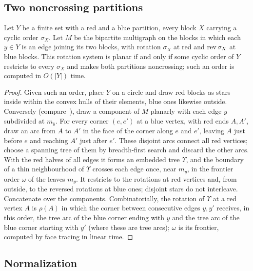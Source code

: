 \subsection{Two noncrossing partitions}\label{sec:v4-partitions}

\begin{lemma}\label{lem:v4-partitions}
Let $Y$ be a finite set with a red and a blue partition, every block $X$
carrying a cyclic order $\sigma_X$. Let $M$ be the bipartite multigraph on
the blocks in which each $y\in Y$ is an edge joining its two blocks, with
rotation $\sigma_X$ at red and $\operatorname{rev}\sigma_X$ at blue blocks. This rotation
system is planar if and only if some cyclic order of $Y$ restricts to every
$\sigma_X$ and makes both partitions noncrossing; such an order is computed
in $O(|Y|)$ time.
\end{lemma}

\begin{proof}
Given such an order, place $Y$ on a circle and draw red blocks as stars
inside within the convex hulls of their elements, blue ones likewise
outside. Conversely
(compare~\cite[Lemma~9]{BE18}), draw a component of $M$ planarly with each
edge $y$ subdivided at $m_y$. For every corner $(e,e')$ at a blue vertex,
with red ends $A,A'$, draw an arc from $A$ to $A'$ in the face of the corner
along $e$ and $e'$, leaving $A$ just before $e$ and reaching $A'$ just after
$e'$. These disjoint arcs connect all red vertices; choose a spanning tree of them
by breadth-first search and discard the other arcs. With the red halves of
all edges it forms an embedded tree $\Upsilon$, and the boundary
of a thin neighbourhood of $\Upsilon$ crosses each edge once, near $m_y$, in
the frontier order $\omega$ of the leaves $m_y$. It restricts to the
rotations at red vertices and, from outside, to the reversed rotations at
blue ones; disjoint stars do not interleave. Concatenate over the
components. Combinatorially, the rotation of $\Upsilon$ at a red vertex $A$
is $\rho(A)$ in which the corner between consecutive edges $y,y'$ receives,
in this order, the tree arc of the blue corner ending with $y$ and the tree
arc of the blue corner starting with $y'$ (where these are tree arcs);
$\omega$ is its frontier, computed by face tracing in linear time.
\end{proof}

\subsection{Normalization}\label{sec:v4-normalize}


